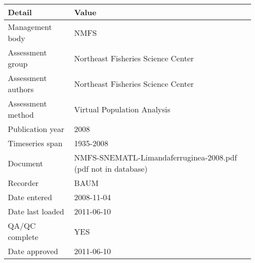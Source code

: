 \begin{table}[htb]
\centering
\begin{tabular}{lp{7cm}}
\toprule
Detail & Value \\
\midrule
Management body    & NMFS                                                          \\
Assessment group   & Northeast Fisheries Science Center                            \\
Assessment authors & Northeast Fisheries Science Center                            \\
Assessment method  & Virtual Population Analysis                                   \\
Publication year   & 2008                                                          \\
Timeseries span    & 1935-2008                                                     \\
Document           & NMFS-SNEMATL-Limandaferruginea-2008.pdf (pdf not in database) \\
Recorder           & BAUM                                                          \\
Date entered       & 2008-11-04                                                    \\
Date last loaded   & 2011-06-10                                                    \\
QA/QC complete     & YES                                                           \\
Date approved      & 2011-06-10                                                    \\
\bottomrule
\end{tabular}
\label{tab:assessdet}
\end{table}
